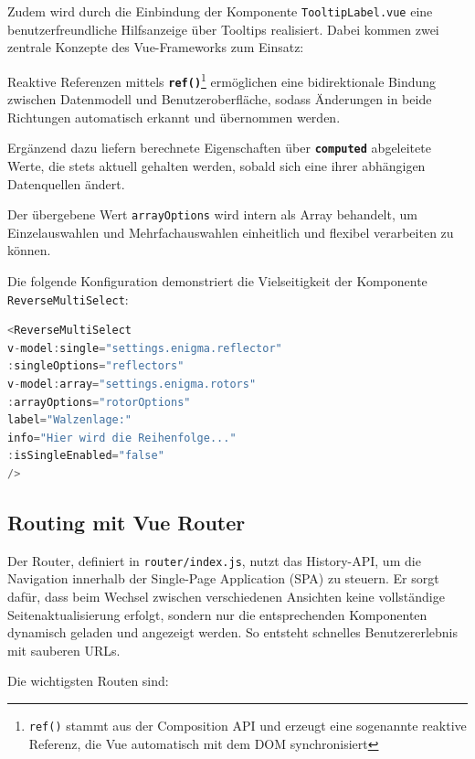 \documentclass[12pt, ngerman, a4paper, numbers=noenddot]{article}
\begin{document}
Zudem wird durch die Einbindung der Komponente \lstinline|TooltipLabel.vue| eine benutzerfreundliche Hilfsanzeige über Tooltips realisiert. Dabei kommen zwei zentrale Konzepte des Vue-Frameworks zum Einsatz: 

Reaktive Referenzen mittels \textbf{\lstinline|ref()|}\footnote{\texttt{ref()} stammt aus der Composition API und erzeugt eine sogenannte reaktive Referenz, die Vue automatisch mit dem DOM synchronisiert} ermöglichen eine bidirektionale Bindung zwischen Datenmodell und Benutzeroberfläche, sodass Änderungen in beide Richtungen automatisch erkannt und übernommen werden. 

Ergänzend dazu liefern berechnete Eigenschaften über \textbf{\lstinline|computed|} abgeleitete Werte, die stets aktuell gehalten werden, sobald sich eine ihrer abhängigen Datenquellen ändert.


Der übergebene Wert \lstinline|arrayOptions| wird intern als Array behandelt, um Einzelauswahlen und Mehrfachauswahlen einheitlich und flexibel verarbeiten zu können.

\newpage
Die folgende Konfiguration demonstriert die Vielseitigkeit der Komponente \newline \lstinline|ReverseMultiSelect|:

\begin{lstlisting}[language=JavaScript, caption=Verwendung von ReverseMultiSelect in Vue]
<ReverseMultiSelect 
v-model:single="settings.enigma.reflector" 
:singleOptions="reflectors"
v-model:array="settings.enigma.rotors" 
:arrayOptions="rotorOptions" 
label="Walzenlage:"
info="Hier wird die Reihenfolge..."
:isSingleEnabled="false" 
/>
\end{lstlisting}




\subsection{Routing mit Vue Router}

Der Router, definiert in \lstinline|router/index.js|, nutzt das History-API, um die Navigation innerhalb der Single-Page Application (SPA) zu steuern. Er sorgt dafür, dass beim Wechsel zwischen verschiedenen Ansichten keine vollständige Seitenaktualisierung erfolgt, sondern nur die entsprechenden Komponenten dynamisch geladen und angezeigt werden. So entsteht schnelles Benutzererlebnis mit sauberen URLs.

Die wichtigsten Routen sind:
\end{document}
